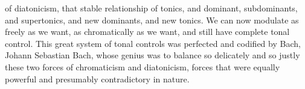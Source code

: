 of diatonicism, that stable relationship of tonics, and dominant, subdominants, and supertonics, and new dominants, and new tonics. We can now modulate as freely as we want, as chromatically as we want, and still have complete tonal control. This great system of tonal controls was perfected and codified by Bach, Johann Sebastian Bach, whose genius was to balance so delicately and so justly these two forces of chromaticism and diatonicism, forces that were equally powerful and presumably contradictory in nature.